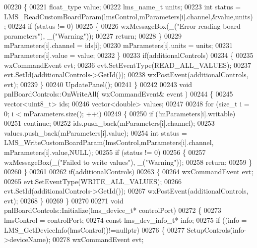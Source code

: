 \begin{DoxyCode}
{00220     \{
00221         float_type value;
00222         lms_name_t units;
00223         \textcolor{keywordtype}{int} status = LMS_ReadCustomBoardParam(lmsControl,mParameters[i].channel,&value,units);
00224         \textcolor{keywordflow}{if} (status != 0)
00225         \{
00226             wxMessageBox(\_(\textcolor{stringliteral}{"Error reading board parameters"}), \_(\textcolor{stringliteral}{"Warning"}));
00227             \textcolor{keywordflow}{return};
00228         \}
00229         mParameters[i].channel = ids[i];
00230         mParameters[i].units = units;
00231         mParameters[i].value = value;
00232     \}
00233     \textcolor{keywordflow}{if}(additionalControls)
00234     \{
00235         wxCommandEvent evt;
00236         evt.SetEventType(READ\_ALL\_VALUES);
00237         evt.SetId(additionalControls->GetId());
00238         wxPostEvent(additionalControls, evt);
00239     \}
00240     UpdatePanel();
00241 \}
00242 
00243 \textcolor{keywordtype}{void} pnlBoardControls::OnWriteAll( wxCommandEvent& event )
00244 \{
00245     vector<uint8\_t> ids;
00246     vector<double> values;
00247 
00248     \textcolor{keywordflow}{for} (\textcolor{keywordtype}{size\_t} i = 0; i < mParameters.size(); ++i)
00249     \{
00250         \textcolor{keywordflow}{if} (!mParameters[i].writable)
00251             \textcolor{keywordflow}{continue};
00252         ids.push\_back(mParameters[i].channel);
00253         values.push\_back(mParameters[i].value);
00254         \textcolor{keywordtype}{int} status = LMS_WriteCustomBoardParam(lmsControl,mParameters[i].channel,
      mParameters[i].value,NULL);
00255         \textcolor{keywordflow}{if} (status != 0)
00256         \{
00257             wxMessageBox(\_(\textcolor{stringliteral}{"Failed to write values"}), \_(\textcolor{stringliteral}{"Warning"}));
00258             \textcolor{keywordflow}{return};
00259         \}
00260     \}
00261 
00262     \textcolor{keywordflow}{if}(additionalControls)
00263     \{
00264         wxCommandEvent evt;
00265         evt.SetEventType(WRITE\_ALL\_VALUES);
00266         evt.SetId(additionalControls->GetId());
00267         wxPostEvent(additionalControls, evt);
00268     \}
00269 \}
00270 
00271 \textcolor{keywordtype}{void} pnlBoardControls::Initialize(lms_device_t* controlPort)
00272 \{
00273     lmsControl = controlPort;
00274     \textcolor{keyword}{const} lms_dev_info_t* info;
00275     \textcolor{keywordflow}{if} ((info = LMS_GetDeviceInfo(lmsControl))!=\textcolor{keyword}{nullptr})
00276     \{
00277         SetupControls(info->deviceName);
00278         wxCommandEvent evt;
}
\end{DoxyCode}
